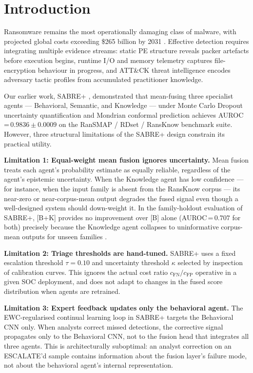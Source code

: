 \documentclass[journal]{IEEEtran}
\begin{document}
\section{Introduction}
\label{sec:intro}

Ransomware remains the most operationally damaging class of malware,
with projected global costs exceeding \$265 billion by 2031
\cite{cybersecurity_ventures_2022}.
Effective detection requires integrating multiple evidence streams:
static PE structure reveals packer artefacts before execution begins,
runtime I/O and memory telemetry captures file-encryption behaviour in
progress, and ATT\&CK threat intelligence encodes adversary tactic
profiles from accumulated practitioner knowledge.

Our earlier work, SABRE+ \cite{kabuye_sabre_2026}, demonstrated that
mean-fusing three specialist agents --- Behavioral, Semantic, and
Knowledge --- under Monte Carlo Dropout uncertainty quantification
and Mondrian conformal prediction achieves AUROC\,=\,$0.9836 \pm 0.0009$
on the RanSMAP / RDset / RansKnow benchmark suite.
However, three structural limitations of the SABRE+ design constrain
its practical utility.

\textbf{Limitation 1: Equal-weight mean fusion ignores uncertainty.}
Mean fusion treats each agent's probability estimate as equally reliable,
regardless of the agent's epistemic uncertainty.
When the Knowledge agent has low confidence --- for instance, when the
input family is absent from the RansKnow corpus --- its near-zero or
near-corpus-mean output degrades the fused signal even though a
well-designed system should down-weight it.
In the family-holdout evaluation of SABRE+, [B+K] provides no
improvement over [B] alone (AUROC\,=\,$0.707$ for both) precisely because
the Knowledge agent collapses to uninformative corpus-mean outputs for
unseen families \cite{kabuye_sabre_2026}.

\textbf{Limitation 2: Triage thresholds are hand-tuned.}
SABRE+ uses a fixed escalation threshold $\tau = 0.10$ and uncertainty
threshold $\kappa$ selected by inspection of calibration curves.
This ignores the actual cost ratio $c_{\mathrm{FN}} / c_{\mathrm{FP}}$
operative in a given SOC deployment, and does not adapt to changes in
the fused score distribution when agents are retrained.

\textbf{Limitation 3: Expert feedback updates only the behavioral agent.}
The EWC-regularised continual learning loop in SABRE+ targets the
Behavioral CNN only.
When analysts correct missed detections, the corrective signal propagates
only to the Behavioral CNN, not to the fusion head that integrates all three agents.
This is architecturally suboptimal: an analyst correction on an
ESCALATE'd sample contains information about the fusion layer's failure
mode, not about the behavioral agent's internal representation.
\end{document}
